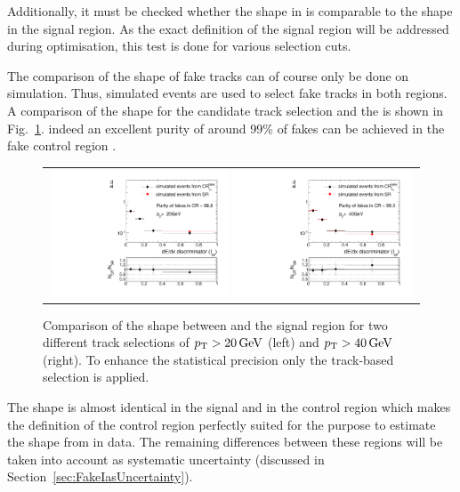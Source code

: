 Additionally, it must be checked whether the \ias shape in \fakeCR is comparable to the \ias shape in the signal region.
As the exact definition of the signal region will be addressed during optimisation, this test is done for various \pt selection cuts.

The comparison of the \ias shape of fake tracks can of course only be done on simulation.
Thus, simulated \WJets events are used to select fake tracks in both regions.
A comparison of the shape for the candidate track selection and the \fakeCR is shown in Fig.~\ref{fig:IasSRCRFakes}.
indeed an excellent purity of around 99\% of fakes can be achieved in the \ias fake control region \fakeCR.


\begin{figure}[!t]
  \centering 
  \begin{tabular}{c}
    \includegraphics[width=0.49\textwidth]{figures/analysis/Background/hASmi_fakes_ECalaoLe5_trackPtGt20.pdf}
    \includegraphics[width=0.49\textwidth]{figures/analysis/Background/hASmi_fakes_ECalaoLe5_trackPtGt40.pdf}
  \end{tabular}
  \caption{Comparison of the \ias shape between \fakeCR and the signal region for two different track \pt selections of $p_{\text{T}}>20\,\text{Ge}\kern-0.06667em\text{V}$ (left) and $p_{\text{T}}>40\,\text{Ge}\kern-0.06667em\text{V}$ (right). To enhance the statistical precision only the track-based selection is applied.}
  \label{fig:IasSRCRFakes}
\end{figure}

The \ias shape is almost identical in the signal and in the control region which makes the definition of the control region perfectly suited for the purpose to estimate the \ias shape from \fakeCR in data.
The remaining differences between these regions will be taken into account as systematic uncertainty (discussed in Section~\ref{sec:FakeIasUncertainty}).

